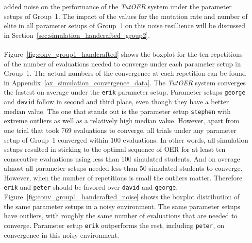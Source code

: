 added noise on the performance of the \emph{TutOER} system under the parameter
setups of Group~1. The impact of the values for the mutation rate and
number of elite in all parameter setups of Group~1 on this noise resillience
will be discussed in Section~\ref{sec:simulation_handcrafted_group2}.\\\\
\noindent
Figure~\ref{fig:conv_group1_handcrafted} shows the boxplot for the ten
repetitions of the number of evaluations needed to converge under each
parameter setup in Group~1. The actual numbers of the convergence at each repetition
can be found in Appendix~\ref{ax_simulation_convergence_data}. The \emph{TutOER} system
converges the fastest on average under the \texttt{erik} parameter setup.
Parameter setups \texttt{george} and \texttt{david} follow in second and third
place, even though they have a better median value. The one that stands out is
the parameter setup \texttt{stephen} with extreme outliers as well as a
relatively high median value. However, apart from one trial that took 769
evaluations to converge, all trials under any parameter setup of Group~1
converged within 100 evaluations. In other words, all simulation setups
resulted in sticking to the optimal sequence of OER for at least ten
consecutive evaluations using less than 100 simulated students. And on average
almost all parameter setups needed less than 50 simulated students to
converge. However, when the number of repetitions is small the outliers matter.
Therefore \texttt{erik} and \texttt{peter} should be favored over
\texttt{david} and \texttt{george}. Figure~\ref{fig:conv_group1_handcrafted_noise}
shows the boxplot distribution of the same parameter setups in a noisy
environment. The same parameter setups have outliers, with roughly the same
number of evaluations that are needed to converge. Parameter setup
\texttt{erik} outperforms the rest, including \texttt{peter}, on convergence in
this noisy environment.
